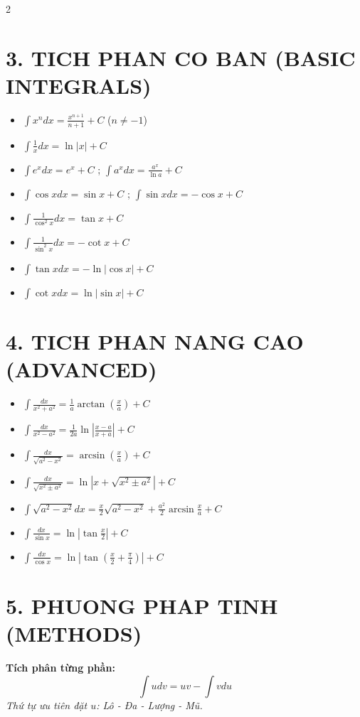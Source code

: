 \documentclass[8pt,a4paper]{article}
\begin{document}
\begin{multicols*}{2}
\section{3. TICH PHAN CO BAN (BASIC INTEGRALS)}
\begin{itemize}
    \item $\int x^n dx = \frac{x^{n+1}}{n+1} + C$ ($n \neq -1$)
    \item $\int \frac{1}{x} dx = \ln|x| + C$
    \item $\int e^x dx = e^x + C$ ; $\int a^x dx = \frac{a^x}{\ln a} + C$
    \item $\int \cos x dx = \sin x + C$ ; $\int \sin x dx = -\cos x + C$
    \item $\int \frac{1}{\cos^2 x} dx = \tan x + C$
    \item $\int \frac{1}{\sin^2 x} dx = -\cot x + C$
    \item $\int \tan x dx = -\ln|\cos x| + C$
    \item $\int \cot x dx = \ln|\sin x| + C$
\end{itemize}

\section{4. TICH PHAN NANG CAO (ADVANCED)}
\begin{itemize}
    \item $\int \frac{dx}{x^2 + a^2} = \frac{1}{a} \arctan(\frac{x}{a}) + C$
    \item $\int \frac{dx}{x^2 - a^2} = \frac{1}{2a} \ln|\frac{x-a}{x+a}| + C$
    \item $\int \frac{dx}{\sqrt{a^2 - x^2}} = \arcsin(\frac{x}{a}) + C$
    \item $\int \frac{dx}{\sqrt{x^2 \pm a^2}} = \ln|x + \sqrt{x^2 \pm a^2}| + C$
    \item $\int \sqrt{a^2 - x^2} dx = \frac{x}{2}\sqrt{a^2-x^2} + \frac{a^2}{2}\arcsin\frac{x}{a} + C$
    \item $\int \frac{dx}{\sin x} = \ln|\tan \frac{x}{2}| + C$
    \item $\int \frac{dx}{\cos x} = \ln|\tan(\frac{x}{2} + \frac{\pi}{4})| + C$
\end{itemize}

\columnbreak

\section{5. PHUONG PHAP TINH (METHODS)}
\textbf{Tích phân từng phần:}
$$\int u dv = uv - \int v du$$
\textit{Thứ tự ưu tiên đặt $u$: Lô - Đa - Lượng - Mũ.}


\end{multicols*}
\end{document}
